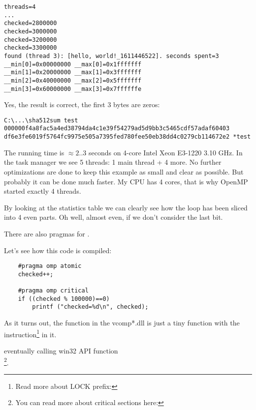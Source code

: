 \begin{lstlisting}
threads=4
...
checked=2800000
checked=3000000
checked=3200000
checked=3300000
found (thread 3): [hello, world!_1611446522]. seconds spent=3
__min[0]=0x00000000 __max[0]=0x1fffffff
__min[1]=0x20000000 __max[1]=0x3fffffff
__min[2]=0x40000000 __max[2]=0x5fffffff
__min[3]=0x60000000 __max[3]=0x7ffffffe
\end{lstlisting}

Yes, the result is correct, the first 3 bytes are zeros:

\begin{lstlisting}
C:\...\sha512sum test
000000f4a8fac5a4ed38794da4c1e39f54279ad5d9bb3c5465cdf57adaf60403
df6e3fe6019f5764fc9975e505a7395fed780fee50eb38dd4c0279cb114672e2 *test
\end{lstlisting}

The running time is $\approx2..3$ seconds on 4-core Intel Xeon E3-1220 3.10 GHz.
In the task manager we see 5 threads: 
1 main thread + 4 more.
No further optimizations are done to keep this example as small and clear as possible.
But probably it can be done much faster.
My \ac{CPU} has 4 cores, that is why OpenMP 
started exactly 4 threads.

By looking at the statistics table we can clearly see how the loop has been sliced into 4 even parts.
Oh well, almost even, if we don't consider the last bit.

There are also pragmas for 
.

Let's see how this code is compiled:

\begin{lstlisting}
	#pragma omp atomic
	checked++;

	#pragma omp critical
	if ((checked % 100000)==0)
		printf ("checked=%d\n", checked);
\end{lstlisting}



As it turns out, the  
function in the vcomp*.dll 
is just a tiny function
with the  instruction\footnote{
Read more about LOCK prefix: } in it.

eventually calling win32 \ac{API} function \\
\footnote{You can read more about critical sections 
here: }.

